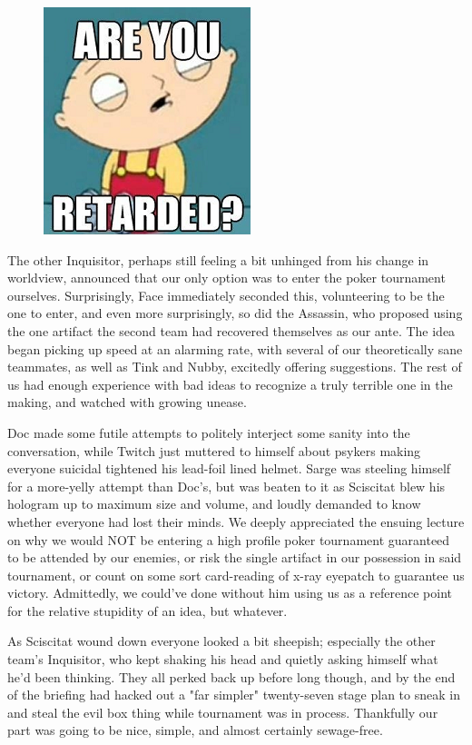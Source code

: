 \begin{figure}
	\begin{center}
		\includegraphics[width=\figwidth]{pics/18/47.png}
	\end{center}
\end{figure}
The other Inquisitor, perhaps still feeling a bit unhinged from his change in worldview, announced that our only option was to enter the poker tournament ourselves. 
Surprisingly, Face immediately seconded this, volunteering to be the one to enter, and even more surprisingly, so did the Assassin, who proposed using the one artifact the second team had recovered themselves as our ante. 
The idea began picking up speed at an alarming rate, with several of our theoretically sane teammates, as well as Tink and Nubby, excitedly offering suggestions. 
The rest of us had enough experience with bad ideas to recognize a truly terrible one in the making, and watched with growing unease.

Doc made some futile attempts to politely interject some sanity into the conversation, while Twitch just muttered to himself about psykers making everyone suicidal tightened his lead-foil lined helmet. 
Sarge was steeling himself for a more-yelly attempt than Doc's, but was beaten to it as Sciscitat blew his hologram up to maximum size and volume, and loudly demanded to know whether everyone had lost their minds. 
We deeply appreciated the ensuing lecture on why we would NOT be entering a high profile poker tournament guaranteed to be attended by our enemies, or risk the single artifact in our possession in said tournament, or count on some sort card-reading of x-ray eyepatch to guarantee us victory. 
Admittedly, we could've done without him using us as a reference point for the relative stupidity of an idea, but whatever.

As Sciscitat wound down everyone looked a bit sheepish; 
especially the other team's Inquisitor, who kept shaking his head and quietly asking himself what he'd been thinking. 
They all perked back up before long though, and by the end of the briefing had hacked out a "far simpler" twenty-seven stage plan to sneak in and steal the evil box thing while tournament was in process. 
Thankfully our part was going to be nice, simple, and almost certainly sewage-free.

